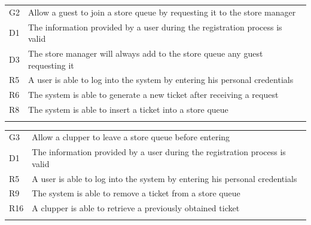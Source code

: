 \documentclass[
]{article}
\begin{document}
\begin{longtable}[]{@{}
  >{\raggedright\arraybackslash}p{}
  >{\raggedright\arraybackslash}p{}@{}}
\toprule
G2 & Allow a guest to join a store queue by requesting it to the store
manager \\ \addlinespace
\midrule
\endhead
D1 & The information provided by a user during the registration process
is valid \\ \addlinespace
D3 & The store manager will always add to the store queue any guest
requesting it \\ \addlinespace
R5 & A user is able to log into the system by entering his personal
credentials \\ \addlinespace
R6 & The system is able to generate a new ticket after receiving a
request \\ \addlinespace
R8 & The system is able to insert a ticket into a store
queue \\ \addlinespace
\bottomrule
\end{longtable}

\begin{longtable}[]{@{}
  >{\raggedright\arraybackslash}p{}
  >{\raggedright\arraybackslash}p{}@{}}
\toprule
G3 & Allow a clupper to leave a store queue before
entering \\ \addlinespace
\midrule
\endhead
D1 & The information provided by a user during the registration process
is valid \\ \addlinespace
R5 & A user is able to log into the system by entering his personal
credentials \\ \addlinespace
R9 & The system is able to remove a ticket from a store
queue \\ \addlinespace
R16 & A clupper is able to retrieve a previously obtained
ticket \\ \addlinespace
\bottomrule
\end{longtable}
\end{document}
